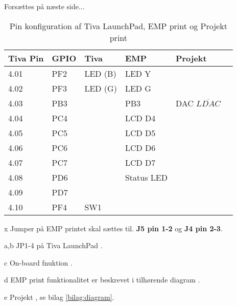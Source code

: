 \begin{table}[h!]
\begin{threeparttable}
		\begin{tablenotes}
			\item[] Forsættes på næste side...
		\end{tablenotes}
	\end{threeparttable}
\end{table}
\newpage
\begin{table}[ht]
	\caption{Pin konfiguration af Tiva LaunchPad, EMP print og Projekt print}
	\begin{threeparttable}
		\begin{tabular}{l l l l l l}
			\toprule
			\textbf{Tiva Pin\tnote{a}} 	& 
			\textbf{GPIO\tnote{b}}  	&
			\textbf{Tiva\tnote{c}} 		& 
			\textbf{EMP\tnote{d}}  		&
			\textbf{Projekt\tnote{e}} 	\\ 
			\midrule
			4.01 & PF2	&LED (B)& LED Y			&								\\
			4.02 & PF3	&LED (G)& LED G			&								\\
			4.03 & PB3	&		& PB3			&	DAC $\overline{LDAC}$							\\
			4.04 & PC4	&		& LCD D4		& 			\\
			4.05 & PC5	&		& LCD D5		& 				\\
			4.06 & PC6	&		& LCD D6		& 				\\
			4.07 & PC7	&		& LCD D7		& 				\\
			4.08 & PD6	&		& Status LED	& 		\\
			4.09 & PD7	&		& 				&								\\
			4.10 & PF4	& SW1	& 				&								\\
			\bottomrule
		\end{tabular}
		
		\begin{tablenotes}
			\item[x] Jumper på EMP printet skal sættes til. \textbf{J5 pin 1-2} og \textbf{J4 pin 2-3}.
			\item[a,b] JP1-4 på Tiva LaunchPad \cite[Afsnit 2.1.5 s. 9]{spmu296}.
			\item[c] On-board fnuktion  \cite[Afsnit 2.1.5 s. 9]{spmu296}.
			\item[d] EMP print funktionalitet er beskrevet i tilhørende diagram \cite{emp-diagram}.
			\item[e] Projekt , se bilag \ref{bilag:diagram}.
		\end{tablenotes}
	\end{threeparttable}
\end{table}